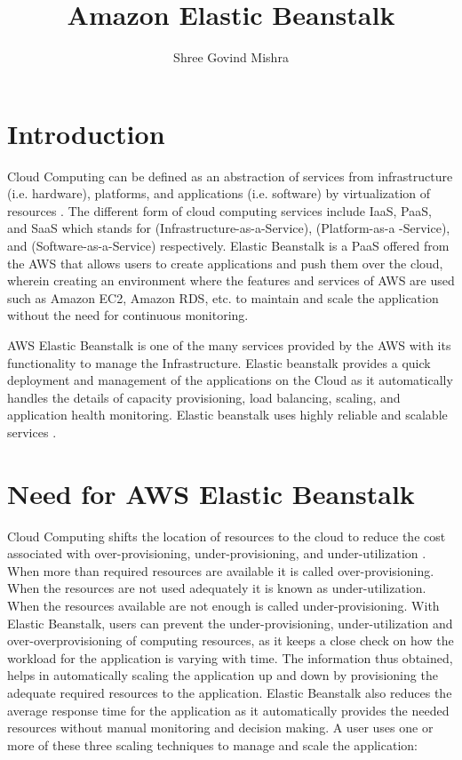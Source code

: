 \documentclass[9pt,twocolumn,twoside]{../../styles/osajnl}
\title{Amazon Elastic Beanstalk}
\author[1]{Shree Govind Mishra}
\affil[1]{School of Informatics and Computing, Bloomington, IN 47408, U.S.A.}
\affil[*]{Corresponding authors: shremish@indiana.edu}
\begin{document}
\maketitle

\section{Introduction}

Cloud Computing can be defined as an abstraction of services from
infrastructure (i.e. hardware), platforms, and applications (i.e.
software) by virtualization of resources \cite{elastic-beanstalk}.
The different form of cloud computing services include IaaS, PaaS,
and SaaS which stands for (Infrastructure-as-a-Service),
(Platform-as-a -Service), and (Software-as-a-Service)
respectively. Elastic Beanstalk is a PaaS offered from the AWS that
allows users to create applications and push them over the cloud,
wherein creating an environment where the features and services of AWS
are used such as Amazon EC2, Amazon RDS, etc. to maintain and scale
the application without the need for continuous monitoring.

AWS Elastic Beanstalk is one of the many services provided by the AWS
with its functionality to manage the Infrastructure. Elastic beanstalk
provides a quick deployment and management of the applications on the
Cloud as it automatically handles the details of capacity
provisioning, load balancing, scaling, and application health
monitoring. Elastic beanstalk uses highly reliable and scalable
services \cite{elastic-beanstalk-2}.

\section{Need for AWS Elastic Beanstalk}

Cloud Computing shifts the location of resources to the cloud to
reduce the cost associated with over-provisioning, under-provisioning,
and under-utilization \cite{cloudcomputing}. When more than required
resources are available it is called over-provisioning. When the
resources are not used adequately it is known as
under-utilization. When the resources available are not enough is
called under-provisioning. With Elastic Beanstalk, users can prevent
the under-provisioning, under-utilization and over-overprovisioning of
computing resources, as it keeps a close check on how the workload for
the application is varying with time. The information thus obtained,
helps in automatically scaling the application up and down by
provisioning the adequate required resources to the
application. Elastic Beanstalk also reduces the average response time
for the application as it automatically provides the needed resources
without manual monitoring and decision making. A user uses one or more
of these three scaling techniques to manage and scale the application:
\end{document}

